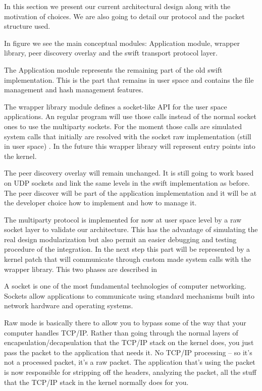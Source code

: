 

In this section we present our current architectural design along with the motivation of choices. We are also going to 
detail our protocol and the packet structure used.

In figure  we see the main conceptual modules: Application module, 
wrapper library, peer discovery overlay and the swift transport protocol layer.


The Application module represents the remaining part of the old swift implementation. This is the part that remains in
user space and contains the file management and hash management features. 

The wrapper library module defines a socket-like API for the user space applications. An regular program will use those
calls instead of the normal socket ones to use the multiparty sockets. For the moment those calls are simulated system
calls that initially are resolved with the socket raw implementation (still in user space) . 
In the future this wrapper library will represent entry points into the kernel.

The peer discovery overlay will remain unchanged. It is still going to work based on UDP sockets and link the same
levels in the swift implementation as before. The peer discover will be part of the application implementation and it
will be at the developer choice how to implement and how to manage it. 

The multiparty protocol is implemented for now at user space level by a raw socket layer to validate our architecture.
This has the advantage of simulating the real design modularization but also permit an easier debugging and testing
procedure of the integration. In the next step this part will be represented by a kernel patch that will communicate
through custom made system calls with the wrapper library. This two phases are described in


A socket is one of the most fundamental technologies of computer networking.
Sockets allow applications to communicate using standard mechanisms built into
network hardware and operating systems.

Raw mode is basically there to allow you to bypass some of the way that your
computer handles TCP/IP. Rather than going through the normal layers of
encapsulation/decapsulation that the TCP/IP stack on the kernel does, you just
pass the packet to the application that needs it. No TCP/IP processing -- so
it's not a processed packet, it's a raw packet. The application that's using
the packet is now responsible for stripping off the headers, analyzing the
packet, all the stuff that the TCP/IP stack in the kernel normally does for
you.

